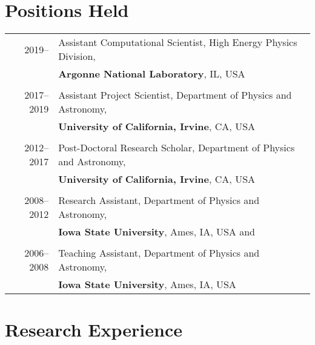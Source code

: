 \documentclass[a4paper,10pt]{article}
\begin{document}
\section{Positions Held}
\begin{tabular}{r|p{15.5cm}}
\textsc{2019--\phantom{0000}}		&		Assistant Computational Scientist, High Energy Physics Division,		\\
							&		{\bf Argonne National Laboratory}, IL, USA  						\\
\multicolumn{2}{c}{} \\
\textsc{2017--2019}				&		Assistant Project Scientist, Department of Physics and Astronomy, 		\\
							&		{\bf University of California, Irvine}, CA, USA  						\\
\multicolumn{2}{c}{} \\
\textsc{2012--2017}				&		Post-Doctoral Research Scholar, Department of Physics and Astronomy, 	\\
							&		{\bf University of California, Irvine}, CA, USA  						\\
\multicolumn{2}{c}{} \\
\textsc{2008--2012}				&		Research Assistant, Department of Physics and Astronomy, 			\\
							&		{\bf Iowa State University}, Ames, IA, USA and 						\\
\multicolumn{2}{c}{} \\
\textsc{2006--2008}				&		Teaching Assistant, Department of Physics and Astronomy, 			\\
							&		{\bf Iowa State University}, Ames, IA, USA 						\\
\end{tabular}

\section{Research Experience}
\vspace{1mm}
\end{document}
